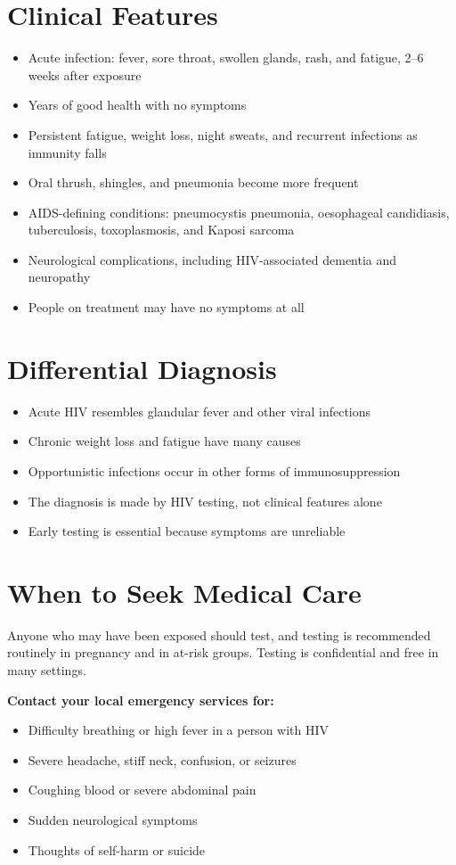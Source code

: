 \section*{Clinical Features}
\begin{itemize}
    \item Acute infection: fever, sore throat, swollen glands, rash, and fatigue, 2--6 weeks after exposure
    \item Years of good health with no symptoms
    \item Persistent fatigue, weight loss, night sweats, and recurrent infections as immunity falls
    \item Oral thrush, shingles, and pneumonia become more frequent
    \item AIDS-defining conditions: pneumocystis pneumonia, oesophageal candidiasis, tuberculosis, toxoplasmosis, and Kaposi sarcoma
    \item Neurological complications, including HIV-associated dementia and neuropathy
    \item People on treatment may have no symptoms at all
\end{itemize}

\section*{Differential Diagnosis}
\begin{itemize}
    \item Acute HIV resembles glandular fever and other viral infections
    \item Chronic weight loss and fatigue have many causes
    \item Opportunistic infections occur in other forms of immunosuppression
    \item The diagnosis is made by HIV testing, not clinical features alone
    \item Early testing is essential because symptoms are unreliable
\end{itemize}

\section*{When to Seek Medical Care}
Anyone who may have been exposed should test, and testing is recommended routinely in pregnancy and in at-risk groups. Testing is confidential and free in many settings.

\textbf{Contact your local emergency services for:}
\begin{itemize}
    \item Difficulty breathing or high fever in a person with HIV
    \item Severe headache, stiff neck, confusion, or seizures
    \item Coughing blood or severe abdominal pain
    \item Sudden neurological symptoms
    \item Thoughts of self-harm or suicide
\end{itemize}


